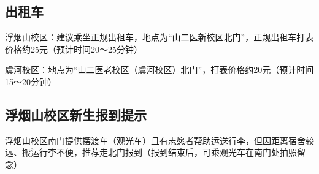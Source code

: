 \subsection[出租车]{出租车}
浮烟山校区：建议乘坐正规出租车，地点为“山二医新校区北门”，正规出租车打表价格约25元（预计时间20～25分钟）

虞河校区：地点为“山二医老校区（虞河校区）北门”，打表价格约20元（预计时间15～20分钟）

\subsection[浮烟山校区新生报到提示]{浮烟山校区新生报到提示}
浮烟山校区南门提供摆渡车（观光车）且有志愿者帮助运送行李，但因距离宿舍较远、搬运行李不便，推荐走北门报到（报到结束后，可乘观光车在南门处拍照留念）